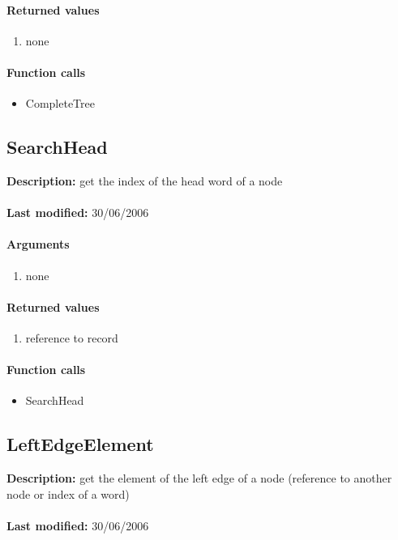 \paragraph{Returned values}
\begin{enumerate}
\item none
\end{enumerate}

\paragraph{Function calls}
\begin{itemize}
\item CompleteTree
\end{itemize}

\subsection{SearchHead}
\textbf{Description:} get the index of the head word of a node\\
\\\textbf{Last modified:} 30/06/2006

\paragraph{Arguments}
\begin{enumerate}
\item none
\end{enumerate}

\paragraph{Returned values}
\begin{enumerate}
\item reference to record
\end{enumerate}

\paragraph{Function calls}
\begin{itemize}
\item SearchHead
\end{itemize}

\subsection{LeftEdgeElement}
\textbf{Description:} get the element of the left edge of a node (reference to another node or index of a word)\\
\\\textbf{Last modified:} 30/06/2006

